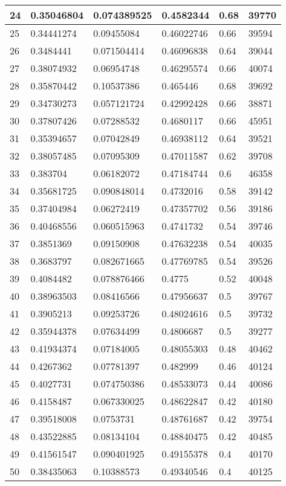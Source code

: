 \begin{longtable}{|l|l|l|l|l|l|}
24 & 0.35046804 & 0.074389525 & 0.4582344 & 0.68 & 39770 \\ \hline 
25 & 0.34441274 & 0.09455084 & 0.46022746 & 0.66 & 39594 \\ \hline 
26 & 0.3484441 & 0.071504414 & 0.46096838 & 0.64 & 39044 \\ \hline 
27 & 0.38074932 & 0.06954748 & 0.46295574 & 0.66 & 40074 \\ \hline 
28 & 0.35870442 & 0.10537386 & 0.465446 & 0.68 & 39692 \\ \hline 
29 & 0.34730273 & 0.057121724 & 0.42992428 & 0.66 & 38871 \\ \hline 
30 & 0.37807426 & 0.07288532 & 0.4680117 & 0.66 & 45951 \\ \hline 
31 & 0.35394657 & 0.07042849 & 0.46938112 & 0.64 & 39521 \\ \hline 
32 & 0.38057485 & 0.07095309 & 0.47011587 & 0.62 & 39708 \\ \hline 
33 & 0.383704 & 0.06182072 & 0.47184744 & 0.6 & 46358 \\ \hline 
34 & 0.35681725 & 0.090848014 & 0.4732016 & 0.58 & 39142 \\ \hline 
35 & 0.37404984 & 0.06272419 & 0.47357702 & 0.56 & 39186 \\ \hline 
36 & 0.40468556 & 0.060515963 & 0.4741732 & 0.54 & 39746 \\ \hline 
37 & 0.3851369 & 0.09150908 & 0.47632238 & 0.54 & 40035 \\ \hline 
38 & 0.3683797 & 0.082671665 & 0.47769785 & 0.54 & 39526 \\ \hline 
39 & 0.4084482 & 0.078876466 & 0.4775 & 0.52 & 40048 \\ \hline 
40 & 0.38963503 & 0.08416566 & 0.47956637 & 0.5 & 39767 \\ \hline 
41 & 0.3905213 & 0.09253726 & 0.48024616 & 0.5 & 39732 \\ \hline 
42 & 0.35944378 & 0.07634499 & 0.4806687 & 0.5 & 39277 \\ \hline 
43 & 0.41934374 & 0.07184005 & 0.48055303 & 0.48 & 40462 \\ \hline 
44 & 0.4267362 & 0.07781397 & 0.482999 & 0.46 & 40124 \\ \hline 
45 & 0.4027731 & 0.074750386 & 0.48533073 & 0.44 & 40086 \\ \hline 
46 & 0.4158487 & 0.067330025 & 0.48622847 & 0.42 & 40180 \\ \hline 
47 & 0.39518008 & 0.0753731 & 0.48761687 & 0.42 & 39754 \\ \hline 
48 & 0.43522885 & 0.08134104 & 0.48840475 & 0.42 & 40485 \\ \hline 
49 & 0.41561547 & 0.090401925 & 0.49155378 & 0.4 & 40170 \\ \hline 
50 & 0.38435063 & 0.10388573 & 0.49340546 & 0.4 & 40125 \\ \hline 
\end{longtable}